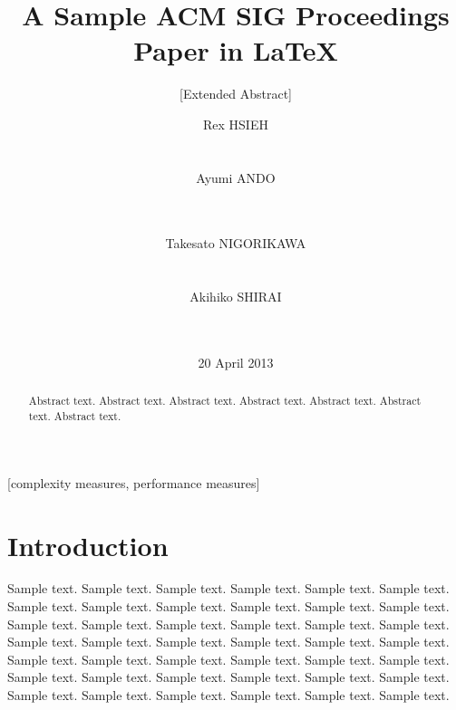 \documentclass{acm_proc_article-sp}
\begin{document}
\title{A Sample {\ttlit ACM} SIG Proceedings Paper in LaTeX}
\subtitle{[Extended Abstract]}

\author{
\alignauthor
Rex HSIEH\\
       \\
       \\
\alignauthor
Ayumi ANDO\\
       \\
       \\
\and %
\alignauthor
Takesato NIGORIKAWA\\
       \\
       \\
\alignauthor
Akihiko SHIRAI\\
       \\
       \\
}

\date{20 April 2013}


\maketitle
\begin{abstract}
Abstract text. Abstract text. Abstract text. Abstract text. Abstract text. Abstract text. Abstract text. 
\end{abstract}

[complexity measures, performance measures]



\section{Introduction}
Sample text. Sample text. Sample text. Sample text. Sample text. Sample text. 
Sample text. Sample text. Sample text. Sample text. Sample text. Sample text. 
Sample text. Sample text. Sample text. Sample text. Sample text. Sample text. 
Sample text. Sample text. Sample text. Sample text. Sample text. Sample text. 
Sample text. Sample text. Sample text. Sample text. Sample text. Sample text. 
Sample text. Sample text. Sample text. Sample text. Sample text. Sample text. 
Sample text. Sample text. Sample text. Sample text. Sample text. Sample text. 
\end{document}
